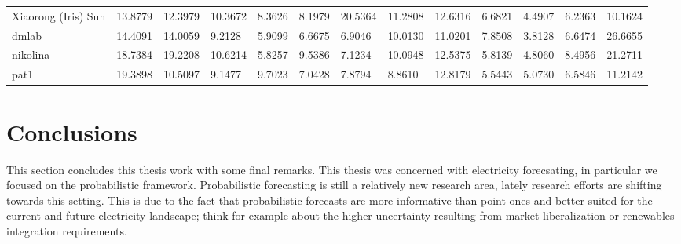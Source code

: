 \begin{table}[!ht]
\begin{adjustbox}{width=\textwidth}
\begin{tabular}{lllllllllllll}
  Xiaorong (Iris) Sun        & 13.8779                         & 12.3979                         & 10.3672                         & 8.3626 & 8.1979                         & 20.5364 & 11.2808                         & 12.6316 & 6.6821  & 4.4907                         & 6.2363                         & 10.1624                         \\
  dmlab                      & 14.4091                         & 14.0059                         & 9.2128                          & 5.9099                         & 6.6675                         & 6.9046  & 10.0130                         & 11.0201 & 7.8508  & 3.8128                         & 6.6474                         & 26.6655                         \\
  nikolina                   & 18.7384 & 19.2208                         & 10.6214                         & 5.8257                         & 9.5386                         & 7.1234  & 10.0948                         & 12.5375 & 5.8139  & 4.8060                         & 8.4956                         & 21.2711 \\
  pat1                       & 19.3898                         & 10.5097                         & 9.1477                          & 9.7023                         & 7.0428                         & 7.8794  & 8.8610                          & 12.8179 & 5.5443  & 5.0730                         & 6.5846                         & 11.2142                       
  \end{tabular}
  \end{adjustbox}
  \end{table}







\section{Conclusions}
This section concludes this thesis work with some final remarks.
This thesis was concerned with electricity forecsating, in particular we focused on the probabilistic framework.
Probabilistic forecasting is still a relatively new research area, lately research efforts are shifting towards this setting. This is due to the fact that probabilistic forecasts are more informative than point ones and better suited for the current and future electricity landscape; think for example about the higher uncertainty resulting from market liberalization or renewables integration requirements.

